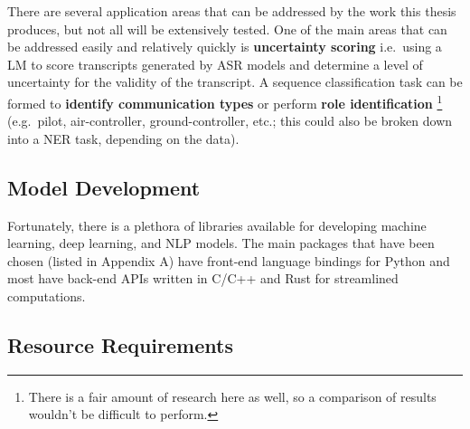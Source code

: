 \documentclass[10pt]{article}
\begin{document}
        There are several application areas that can be addressed by the work this thesis produces, but not all will be extensively
        tested. One of the main areas that can be addressed easily and relatively quickly is \textbf{uncertainty scoring} i.e.~using a
        LM to score transcripts generated by ASR models and determine a level of uncertainty for the validity of the transcript.
        A sequence classification task can be formed to \textbf{identify communication types} or perform \textbf{role identification}
        \footnote{There is a fair amount of research here as well, so a comparison of results wouldn't be difficult to perform.}
        (e.g.~pilot, air-controller, ground-controller, etc.; this could also be broken down into a NER task, depending on the data).

        \subsection{Model Development}
        Fortunately, there is a plethora of libraries available for developing machine learning, deep learning, and NLP models. The
        main packages that have been chosen (listed in Appendix A) have front-end language bindings for Python and most have
        back-end APIs written in C/C++ and Rust for streamlined computations.

        \subsection{Resource Requirements}

    \clearpage
\end{document}
